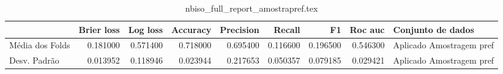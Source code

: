 \begin{table}
\centering
\caption{nbiso_full_report_amostrapref.tex}
\label{nbiso_full_report_amostrapref.tex}
\begin{tabular}{lrrrrrrrl}
\toprule
{}              &  Brier  loss &  Log loss &  Accuracy  &  Precision  &   Recall  &       F1  &  Roc auc  &         Conjunto de dados \\
\midrule
Média dos Folds &     0.181000 &  0.571400 &   0.718000 &    0.695400 &  0.116600 &  0.196500 &  0.546300 &  Aplicado Amostragem pref \\
Desv. Padrão    &     0.013952 &  0.118946 &   0.023944 &    0.217653 &  0.050357 &  0.079185 &  0.029421 &  Aplicado Amostragem pref \\
\bottomrule
\end{tabular}
\end{table}
